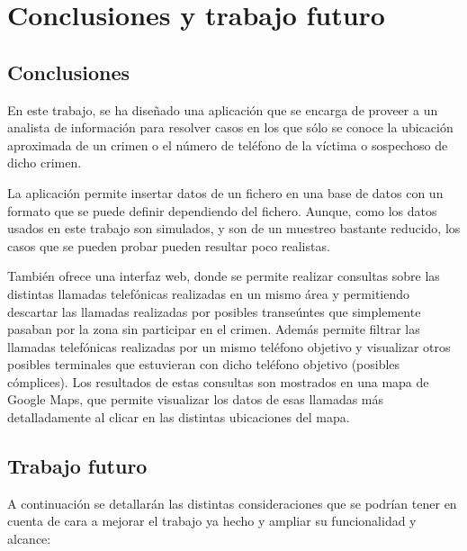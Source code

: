 \chapter{Conclusiones y trabajo futuro\label{CAP:CONCTRAB}}
  \section{Conclusiones\label{SEC:CONCLUSIONES}}
    En este trabajo, se ha diseñado una aplicación que se encarga de proveer a un analista de información para resolver casos en los que sólo se conoce la ubicación aproximada de un crimen o el número de teléfono de la víctima o sospechoso de dicho crimen.
    
    La aplicación permite insertar datos de un fichero en una base de datos con un formato que se puede definir dependiendo del fichero. Aunque, como los datos usados en este trabajo son simulados, y son de un muestreo bastante reducido, los casos que se pueden probar pueden resultar poco realistas.
    
    También ofrece una interfaz web, donde se permite realizar consultas sobre las distintas llamadas telefónicas realizadas en un mismo área y permitiendo descartar las llamadas realizadas por posibles transeúntes que simplemente pasaban por la zona sin participar en el crimen.
    Además permite filtrar las llamadas telefónicas realizadas por un mismo teléfono objetivo y visualizar otros posibles terminales que estuvieran con dicho teléfono objetivo (posibles cómplices).
    Los resultados de estas consultas son mostrados en una mapa de Google Maps, que permite visualizar los datos de esas llamadas más detalladamente al clicar en las distintas ubicaciones del mapa.
    
  \section{Trabajo futuro\label{SEC:TRABAJO}}
    A continuación se detallarán las distintas consideraciones que se podrían tener en cuenta de cara a mejorar el trabajo ya hecho y ampliar su funcionalidad y alcance:
    
